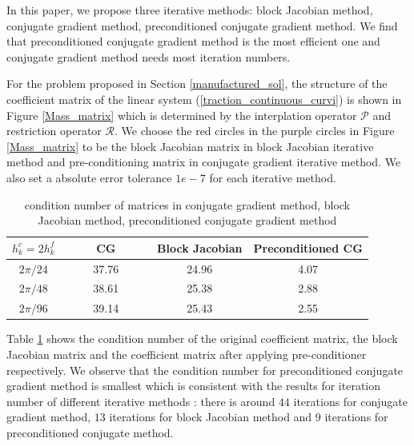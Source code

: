\documentclass[a4paper]{article}
\begin{document}
In this paper, we propose three iterative methods: block Jacobian method, conjugate gradient method, preconditioned conjugate gradient method. We find that preconditioned conjugate gradient method is the most efficient one and conjugate gradient method needs most iteration numbers.

For the problem proposed in Section \ref{manufactured_sol}, the structure of the coefficient matrix of the linear system (\ref{traction_continuous_curvi}) is shown in Figure \ref{Mass_matrix} which is determined by the interplation operator $\mathcal{P}$ and restriction operator $\mathcal{R}$. We choose the red circles in the purple circles in Figure \ref{Mass_matrix} to be the block Jacobian matrix in block Jacobian iterative method and pre-conditioning matrix in conjugate gradient iterative method. We also set a absolute error tolerance $1e-7$ for each iterative method.

\begin{table}[htb]
	\begin{center}
		\begin{tabular}{|c|c c c|}
			\hline
			$h^c_k = 2h^f_k$   & ~~~~ CG ~~~~& Block Jacobian & Preconditioned CG  \\
			\hline
			$2\pi/24$ &37.76& 24.96& 4.07\\
			\hline
			$2\pi/48$ &38.61 & 25.38 & 2.88\\
			\hline 
			$2\pi/96$ &39.14 &25.43 & 2.55\\
			\hline
		\end{tabular}
	\end{center}
\caption{condition number of matrices in conjugate gradient method, block Jacobian method, preconditioned conjugate gradient method}\label{condition_number}
\end{table} 
Table \ref{condition_number} shows the condition number of the original coefficient matrix, the block Jacobian matrix and the coefficient matrix after applying pre-conditioner respectively. We observe that the condition number for preconditioned conjugate gradient method is smallest which is consistent with the results for iteration number of different iterative methods : there is around $44$ iterations for conjugate gradient method, $13$ iterations for block Jacobian method and $9$ iterations for preconditioned conjugate method.
\end{document}
